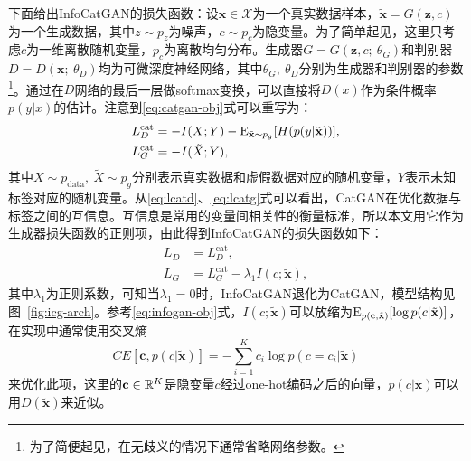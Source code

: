 下面给出InfoCatGAN的损失函数：设$\mathbf{x} \in \mathcal{X}$为一个真实数据样本，$\tilde{\mathbf{x}} = G(\mathbf{z}, c)$为一个生成数据，其中$z\sim p_z$为噪声，$c\sim p_c$为隐变量。为了简单起见，这里只考虑$c$为一维离散随机变量，$p_c$为离散均匀分布。生成器$G = G(\mathbf{z}, c; ~\theta_G)$和判别器$D = D(\mathbf{x}; ~\theta_D)$均为可微深度神经网络，其中$\theta_G, ~\theta_D$分别为生成器和判别器的参数\footnote{为了简便起见，在无歧义的情况下通常省略网络参数。}。通过在$D$网络的最后一层做softmax变换，可以直接将$D(x)$作为条件概率$p(y|x)$的估计。注意到\eqref{eq:catgan-obj}式可以重写为：
\begin{align}
  L_D^{\text{cat}} &= -I(X;Y)-
         \text{E}_{\tilde{\mathbf{x}} \sim p_g}[H(p(y|\tilde{\mathbf{x}}))], \label{eq:lcatd} \\
  L_G^{\text{cat}} &= -I(\tilde{X}; Y), \label{eq:lcatg}
\end{align}
其中$X \sim p_{\text{data}}, ~\tilde{X} \sim p_g$分别表示真实数据和虚假数据对应的随机变量，$Y$表示未知标签对应的随机变量。从\eqref{eq:lcatd}、\eqref{eq:lcatg}式可以看出，CatGAN在优化数据与标签之间的互信息。互信息是常用的变量间相关性的衡量标准，所以本文用它作为生成器损失函数的正则项，由此得到InfoCatGAN的损失函数如下：
\begin{equation}
\label{eq:infocatgan}
\begin{split}
  L_D &= L_D^{\text{cat}}, \\ 
  L_G &= L_G^{\text{cat}} - \lambda_1 I(c; \tilde{\mathbf{x}}),
\end{split}
\end{equation}
其中$\lambda_1$为正则系数，可知当$\lambda_1 = 0$时，InfoCatGAN退化为CatGAN，模型结构见图~\ref{fig:icg-arch}。参考\eqref{eq:infogan-obj}式，$I(c; \tilde{\mathbf{x}})$可以放缩为$\text{E}_{p(\mathbf{c},\tilde{\mathbf{x}})}[\log p(c|\tilde{\mathbf{x}})]$，在实现中通常使用交叉熵
\begin{equation}
  CE[\mathbf{c}, p(c|\tilde{\mathbf{x}})] = -\sum_{i=1}^K c_i \log p(c=c_i | \tilde{\mathbf{x}})
\end{equation}
来优化此项，这里的$\mathbf{c} \in \mathbb{R}^K$是隐变量$c$经过one-hot编码之后的向量，$p(c|\tilde{\mathbf{x}})$可以用$D(\tilde{\mathbf{x}})$来近似。

